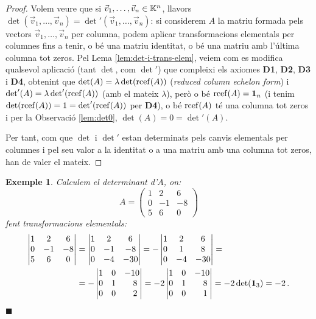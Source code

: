 \documentclass[
  11pt,
]{book}
\numberwithin{dummy}{section}
\theoremstyle{maincolornumbox}
\theoremstyle{blacknumex}
\newtheorem{exampleT}{Exemple}[chapter]
\theoremstyle{blacknumbox}
\theoremstyle{maincolornum}
\newenvironment{example}{\begin{exampleT}}{\hfill{\tiny\ensuremath{\blacksquare}}\end{exampleT}}
\begin{document}
\begin{proof}
Volem veure que si \(\vec v_1, \dots , \vec v_n \in \mathbb{K}^n\),
llavors
\(\det(\vec v_1, \dots , \vec v_n)=\det'(\vec v_1, \dots , \vec v_n)\): si
considerem \(A\) la matriu formada pels vectors
\(\vec v_1, \dots, \vec v_n\) per columna, podem aplicar transformacions
elementals per columnes fins a tenir, o bé una matriu identitat, o bé
una matriu amb l'última columna tot zeros. Pel Lema
\ref{lem:det-i-trans-elem}, veiem com es modifica qualsevol
aplicació (tant \(\det\), com \(\det'\)) que compleixi els axiomes \textbf{D1},
\textbf{D2}, \textbf{D3} i \textbf{D4}, obtenint que \(\det(A)=\lambda\det(\operatorname{rcef}(A))\)
(\emph{reduced column echelon form}) i \(\det'(A)=\lambda\det'(\operatorname{rcef}(A))\) (amb
el mateix \(\lambda\)), però o bé \(\operatorname{rcef}(A)=\mathbf{1}_n\) (i tenim
\(\det(\operatorname{rcef}(A))=1=\det'(\operatorname{rcef}(A))\) per \textbf{D4}), o bé \(\operatorname{rcef}(A)\) té una
columna tot zeros i per la Observació
\ref{lem:det0},
\(\det(A)=0=\det'(A)\).

Per tant, com que \(\det\) i \(\det'\) estan determinats pels canvis
elementals per columnes i pel seu valor a la identitat o a una matriu
amb una columna tot zeros, han de valer el mateix.
\end{proof}

\begin{example}
Calculem el determinant d'\(A\), on:\[A=\begin{pmatrix}
    1 & 2 & 6 \\ 0 & -1 & -8 \\ 5 & 6 & 0
    \end{pmatrix}\] fent transformacions elementals: \begin{align*}
    \begin{vmatrix}
    1 & 2 & 6 \\ 0 & -1 & -8 \\ 5 & 6 & 0
    \end{vmatrix} & =
    \begin{vmatrix}
    1 & 2 & 6 \\ 0 & -1 & -8 \\ 0 & -4 & -30
    \end{vmatrix}= 
    -\begin{vmatrix}
    1 & 2 & 6 \\ 0 & 1 & 8 \\ 0 & -4 & -30
    \end{vmatrix}= \\ &
    = -\begin{vmatrix}
    1 & 0 & -10 \\ 0 & 1 & \phantom{-}8 \\ 0 & 0 & \phantom{-}2
    \end{vmatrix}=
    -2\begin{vmatrix}
    1 & 0 & -10 \\ 0 & 1 & \phantom{-}8 \\ 0 & 0 & \phantom{-}1
    \end{vmatrix}= -2 \det(\mathbf{1}_3)=-2\,.
\end{align*}
\end{example}
\end{document}
